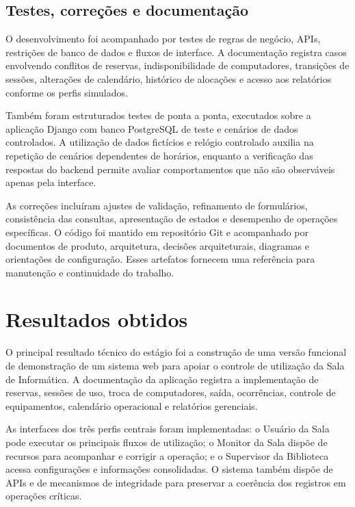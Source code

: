 \subsection{Testes, correções e documentação}

O desenvolvimento foi acompanhado por testes de regras de negócio, APIs, restrições de banco de dados e fluxos de interface. A documentação registra casos envolvendo conflitos de reservas, indisponibilidade de computadores, transições de sessões, alterações de calendário, histórico de alocações e acesso aos relatórios conforme os perfis simulados.

Também foram estruturados testes de ponta a ponta, executados sobre a aplicação Django com banco PostgreSQL de teste e cenários de dados controlados. A utilização de dados fictícios e relógio controlado auxilia na repetição de cenários dependentes de horários, enquanto a verificação das respostas do backend permite avaliar comportamentos que não são observáveis apenas pela interface.

As correções incluíram ajustes de validação, refinamento de formulários, consistência das consultas, apresentação de estados e desempenho de operações específicas. O código foi mantido em repositório Git e acompanhado por documentos de produto, arquitetura, decisões arquiteturais, diagramas e orientações de configuração. Esses artefatos fornecem uma referência para manutenção e continuidade do trabalho.

\section{Resultados obtidos}\label{sec:resultados}

O principal resultado técnico do estágio foi a construção de uma versão funcional de demonstração de um sistema web para apoiar o controle de utilização da Sala de Informática. A documentação da aplicação registra a implementação de reservas, sessões de uso, troca de computadores, saída, ocorrências, controle de equipamentos, calendário operacional e relatórios gerenciais.

As interfaces dos três perfis centrais foram implementadas: o Usuário da Sala pode executar os principais fluxos de utilização; o Monitor da Sala dispõe de recursos para acompanhar e corrigir a operação; e o Supervisor da Biblioteca acessa configurações e informações consolidadas. O sistema também dispõe de APIs e de mecanismos de integridade para preservar a coerência dos registros em operações críticas.

